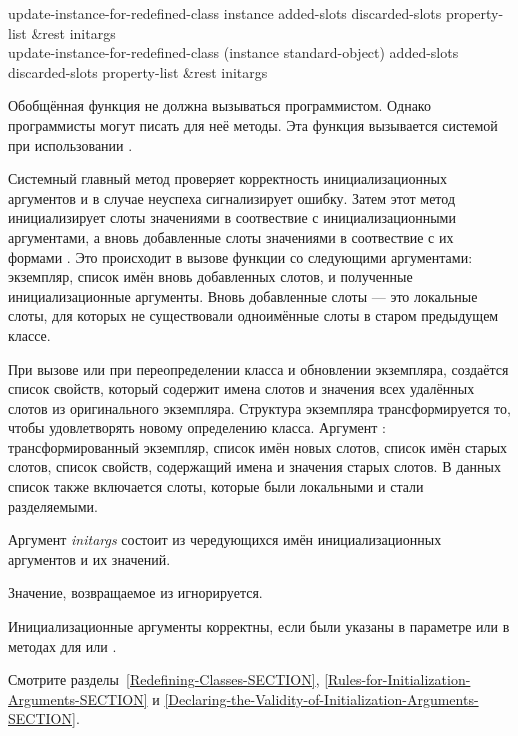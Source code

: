 \begin{defun}
update-instance-for-redefined-class instance added-slots
    discarded-slots property-list &rest initargs \\
update-instance-for-redefined-class (instance standard-object) added-slots
    discarded-slots property-list &rest initargs

Обобщённая функция  не должна
вызываться программистом. Однако программисты могут писать для неё методы. Эта
функция вызывается системой при использовании .

Системный главный метод  проверяет
корректность инициализационных аргументов и в случае неуспеха сигнализирует
ошибку. Затем этот метод инициализирует слоты значениями в соотвествие с
инициализационными аргументами, а вновь добавленные слоты значениями в
соотвествие с их формами . Это происходит в вызове функции
 со следующими аргументами: экземпляр, список имён вновь
добавленных слотов, и полученные инициализационные аргументы. Вновь добавленные
слоты --- это локальные слоты, для которых не существовали одноимённые слоты в
старом предыдущем классе.

При вызове  или при переопределении класса и
обновлении экземпляра, создаётся список свойств, который содержит имена слотов и
значения всех удалённых слотов из оригинального экземпляра. Структура экземпляра
трансформируется то, чтобы удовлетворять новому определению класса. Аргумент
: трансформированный экземпляр, список
имён новых слотов, список имён старых слотов, список свойств, содержащий имена и
значения старых слотов. В данных список также включается слоты, которые были
локальными и стали разделяемыми.

Аргумент \emph{initargs} состоит из чередующихся имён инициализационных
аргументов и их значений.

Значение, возвращаемое из  игнорируется.

Инициализационные аргументы корректны, если были указаны в параметре
 или в методах для  или
.

Смотрите разделы~\ref{Redefining-Classes-SECTION},
\ref{Rules-for-Initialization-Arguments-SECTION} и
\ref{Declaring-the-Validity-of-Initialization-Arguments-SECTION}.


\end{defun}
